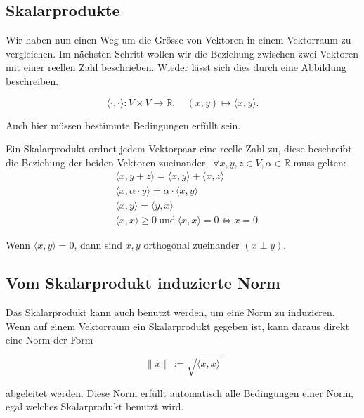 \subsection{Skalarprodukte}

Wir haben nun einen Weg um die Grösse von Vektoren in einem Vektorraum zu vergleichen. Im nächsten Schritt wollen wir die Beziehung zwischen zwei Vektoren mit einer reellen Zahl beschrieben. Wieder lässt sich dies durch eine Abbildung beschreiben. 

\begin{equation*}
    \langle \cdot, \cdot \rangle : V \times V \rightarrow \mathbb{R}, \quad (x, y) \mapsto \langle x, y \rangle.
\end{equation*}

\vspace{0.5\baselineskip}

Auch hier müssen bestimmte Bedingungen erfüllt sein.

\begin{tcolorbox}[colback=gray!30, colframe=gray!80, title=Skalarprodukte]
    Ein Skalarprodukt ordnet jedem Vektorpaar eine reelle Zahl zu, diese beschreibt die Beziehung der beiden Vektoren zueinander.\ \( \forall x, y, z \in V, \alpha \in \mathbb{R} \) muss gelten:
    \begin{equation*}
        \begin{aligned}
            & \langle x, y + z \rangle = \langle x, y \rangle + \langle x, z \rangle \\[0.5em]
            & \langle x, \alpha \cdot y \rangle = \alpha \cdot \langle x, y \rangle \\[0.5em]
            & \langle x, y \rangle = \langle y, x \rangle \\[0.5em]
            & \langle x, x \rangle \geq 0 \ \text{und} \ \langle x, x \rangle = 0 \Leftrightarrow x = 0
        \end{aligned}
    \end{equation*}
\end{tcolorbox}

\vspace{0.5\baselineskip}

Wenn \( \langle x, y \rangle = 0 \), dann sind \( x, y \) orthogonal zueinander \( (x \perp y) \). 

\subsection{Vom Skalarprodukt induzierte Norm}

Das Skalarprodukt kann auch benutzt werden, um eine Norm zu induzieren. Wenn auf einem Vektorraum ein Skalarprodukt gegeben ist, kann daraus direkt eine Norm der Form

\begin{equation*}
    \| x \| := \sqrt{\langle x, x \rangle}
\end{equation*}

abgeleitet werden. Diese Norm erfüllt automatisch alle Bedingungen einer Norm, egal welches Skalarprodukt benutzt wird. 